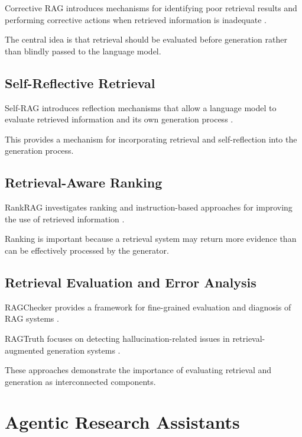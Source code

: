 \documentclass[12pt,a4paper]{article}
\begin{document}
Corrective RAG introduces mechanisms for identifying poor retrieval results
and performing corrective actions when retrieved information is inadequate
\cite{yan2024crag}.

The central idea is that retrieval should be evaluated before generation
rather than blindly passed to the language model.

\subsection{Self-Reflective Retrieval}

Self-RAG introduces reflection mechanisms that allow a language model to
evaluate retrieved information and its own generation process
\cite{asai2024selfrag}.

This provides a mechanism for incorporating retrieval and self-reflection
into the generation process.

\subsection{Retrieval-Aware Ranking}

RankRAG investigates ranking and instruction-based approaches for improving
the use of retrieved information \cite{yu2024rankrag}.

Ranking is important because a retrieval system may return more evidence
than can be effectively processed by the generator.

\subsection{Retrieval Evaluation and Error Analysis}

RAGChecker provides a framework for fine-grained evaluation and diagnosis
of RAG systems \cite{ru2024ragchecker}.

RAGTruth focuses on detecting hallucination-related issues in
retrieval-augmented generation systems \cite{niu2024ragtruth}.

These approaches demonstrate the importance of evaluating retrieval and
generation as interconnected components.

\section{Agentic Research Assistants}
\label{sec:agentic}
\end{document}
